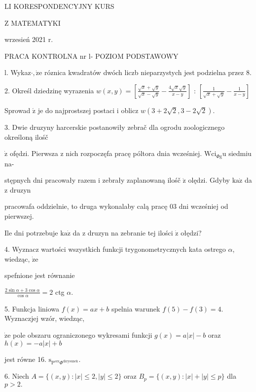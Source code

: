 \documentclass[a4paper,12pt]{article}
\begin{document}
LI KORESPONDENCYJNY KURS

Z MATEMATYKI

wrzesień 2021 r.

PRACA KONTROLNA nr l- POZIOM PODSTAWOWY

l. Wykaz$\cdot, \dot{\mathrm{z}}\mathrm{e}$ róznica kwadratów dwóch liczb nieparzystych jest podzielna przez 8.

2. Określ dziedzinę wyrazenia $w(x,y)= [\displaystyle \frac{\sqrt{x}+\sqrt{y}}{\sqrt{x}-\sqrt{y}}-\frac{4\sqrt{x}\sqrt{y}}{x-y}]$ : $[\displaystyle \frac{1}{\sqrt{x}+\sqrt{y}}-\frac{1}{x-y}]$

Sprowad $\acute{\mathrm{z}}$ je do najprostszej postaci $\mathrm{i}$ oblicz $w(3+2\sqrt{2},3-2\sqrt{2}).$

3. Dwie druzyny harcerskie postanowiły zebrač dla ogrodu zoologicznego określoną ilośč

$\dot{\mathrm{z}}$ ofędzi. Pierwsza $\mathrm{z}$ nich rozpoczęfa pracę póltora dnia wcześniej. $\mathrm{W}\mathrm{c}\mathrm{i}_{\Phi \mathrm{g}}\mathrm{u}$ siedmiu na-

stępnych dni pracowały razem $\mathrm{i}$ zebrały zaplanowaną ilośč $\dot{\mathrm{z}}$ olędzi. Gdyby $\mathrm{k}\mathrm{a}\dot{\mathrm{z}}$ da $\mathrm{z}$ druzyn

pracowafa oddzielnie, to druga wykonalaby calą pracę $03$ dni wcześniej od pierwszej.

Ile dni potrzebuje $\mathrm{k}\mathrm{a}\dot{\mathrm{z}}$ da $\mathrm{z}$ druzyn na zebranie tej ilości $\dot{\mathrm{z}}$ ołędzi?

4. Wyznacz wartości wszystkich funkcji trygonometrycznych kata ostrego $\alpha$, wiedząc, $\dot{\mathrm{z}}\mathrm{e}$

spefnione jest równanie

$\displaystyle \frac{2\sin\alpha+3\cos\alpha}{\cos\alpha}=2$ ctg $\alpha.$

5. Funkcja liniowa $f(x)=ax+b$ spelnia warunek $f(5)-f(3)=4$. Wyznaczjej wzór, wiedząc,

$\dot{\mathrm{z}}\mathrm{e}$ pole obszaru ograniczonego wykresami funkcji $g(x)=a|x|-b$ oraz $h(x)=-a|x|+b$

jest równe 16. $\mathrm{s}_{\mathrm{P}^{\mathrm{o}\mathrm{r}\mathrm{z}}\Phi^{\mathrm{d}\acute{\mathrm{z}}\mathrm{r}\mathrm{y}\mathrm{s}\mathrm{u}\mathrm{n}\mathrm{e}\mathrm{k}}}.$

6. Niech $A= \{(x,y):|x|\leq 2,|y|\leq 2\}$ oraz $B_{p}= \{(x,y):|x|+|y|\leq p\}$ dla $p> 2.$
\end{document}
